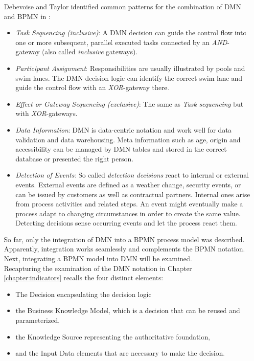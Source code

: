 Debevoise and Taylor identified common patterns for the combination of DMN and BPMN in \cite{DMNmicroguide}:
\begin{itemize}
\item \textit{Task Sequencing (inclusive)}: A DMN decision can guide the control flow into one or more subsequent, parallel executed tasks connected by an \textit{AND}-gateway (also called \textit{inclusive} gateways). 
\item \textit{Participant Assignment}: Responsibilities are usually illustrated by pools and swim lanes. The DMN decision logic can identify the correct swim lane and guide the control flow with an \textit{XOR}-gateway there.
\item \textit{Effect or Gateway Sequencing (exclusive)}: The same as \textit{Task sequencing} but with \textit{XOR}-gateways.
\item \textit{Data Information}: DMN is data-centric notation and work well for data validation and data warehousing. Meta information such as age, origin and accessibility can be managed by DMN tables and stored in the correct database or presented the right person. 
\item \textit{Detection of Events}:  So called \textit{detection decisions} \cite{DMNmicroguide} react to internal or external events. External events are defined as a weather change, security events, or can be issued by customers as well as contractual partners. Internal ones arise from process activities and related steps. An event might eventually make a process adapt to changing circumstances in order to create the same value. Detecting decisions sense occurring events and let the process react them. 
\end{itemize}

So far, only the integration of DMN into a BPMN process model was described. Apparently, integration works seamlessly and complements the BPMN notation. Next, integrating a BPMN model into DMN will be examined. \\
Recapturing the examination of the DMN notation in Chapter \ref{chapter:indicators} recalls the four distinct elements: 
\begin{itemize}
\item The Decision encapsulating the decision logic
\item the Business Knowledge Model, which is a decision that can be reused and parameterized, \cite{DMNmicroguide}
\item the Knowledge Source representing the authoritative foundation,
\item and the Input Data elements that are necessary to make the decision.
\end{itemize}

